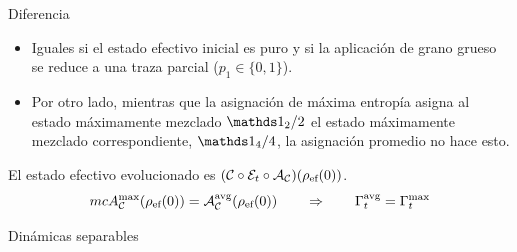 \begin{frame}{Diferencia}
    \begin{itemize}
        \item Iguales si el estado efectivo inicial es puro y si la aplicación de grano grueso se reduce a una traza parcial ($p_{1}\in\{0,1\}$).
        \item Por otro lado, mientras que la asignación de máxima entropía asigna al estado máximamente mezclado $\Id_{2}/2$ el estado máximamente mezclado correspondiente, $\Id_{4}/4$, la asignación promedio no hace esto.
    \end{itemize}
    \begin{center}
        El estado efectivo evolucionado es $(\mathcal{C}\circ\mathcal{E}_{t}\circ\mathcal{A}_{\mathcal{C}})(\rho_{\text{ef}}(0))$.
        \begin{equation}
            mcA_{\mathcal{C}}^{\max}(\rho_{\text{ef}}(0))=\mathcal{A}_{\mathcal{C}}^{\text{avg}}(\rho_{\text{ef}}(0)) \qquad \Rightarrow \qquad \Gamma_{t}^{\text{avg}}=\Gamma_{t}^{\max} \nonumber
        \end{equation}
    \end{center}
\end{frame}

\begin{frame}{Dinámicas separables}
    \lipsum[1]
\end{frame}

